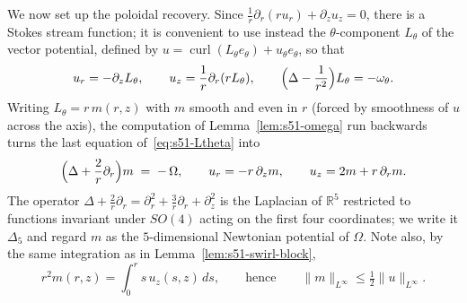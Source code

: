\documentclass[11pt]{article}
\theoremstyle{definition}
\theoremstyle{remark}
\newcommand{\R}{\mathbb{R}}
\newcommand{\curl}{\operatorname{curl}}
\begin{document}
We now set up the poloidal recovery. Since
$\tfrac1r\partial_r(ru_r)+\partial_zu_z=0$, there is a Stokes stream function;
it is convenient to use instead the $\theta$-component $L_\theta$ of the
vector potential, defined by $u=\curl(L_\theta e_\theta)+u_\theta e_\theta$,
so that
\begin{equation}\label{eq:s51-Ltheta}
  u_r = -\partial_zL_\theta,
  \qquad
  u_z = \frac1r\partial_r(rL_\theta),
  \qquad
  \Bigl(\Delta-\frac1{r^2}\Bigr)L_\theta = -\omega_\theta .
\end{equation}
Writing $L_\theta=r\,m(r,z)$ with $m$ smooth and even in $r$ (forced by
smoothness of $u$ across the axis), the computation of
Lemma~\ref{lem:s51-omega} run backwards turns the last equation
of~\eqref{eq:s51-Ltheta} into
\begin{equation}\label{eq:s51-m}
  \Bigl(\Delta+\frac2r\partial_r\Bigr)m \;=\; -\,\Omega,
  \qquad
  u_r = -r\,\partial_zm,
  \qquad
  u_z = 2m + r\,\partial_rm .
\end{equation}
The operator $\Delta+\tfrac2r\partial_r=\partial_r^2+\tfrac3r\partial_r
+\partial_z^2$ is the Laplacian of $\R^5$ restricted to functions invariant
under $SO(4)$ acting on the first four coordinates; we write it $\Delta_5$ and
regard $m$ as the $5$-dimensional Newtonian potential of $\Omega$. Note also,
by the same integration as in Lemma~\ref{lem:s51-swirl-block},
\begin{equation}\label{eq:s51-m-bound}
  r^2m(r,z)=\int_0^rs\,u_z(s,z)\,ds,
  \qquad\text{hence}\qquad
  \|m\|_{L^\infty}\leq\tfrac12\|u\|_{L^\infty}.
\end{equation}
\end{document}
